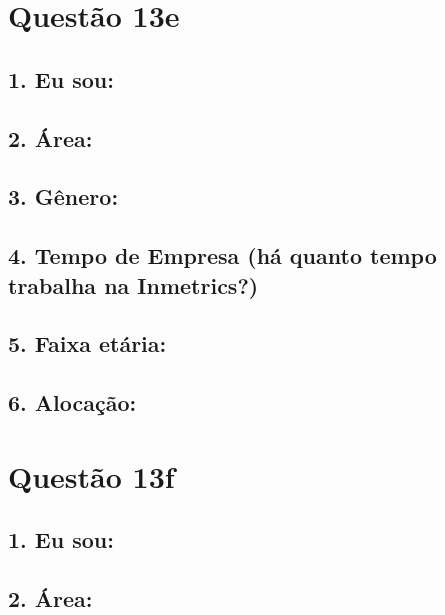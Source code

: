\documentclass[]{book}
\begin{document}
\hypertarget{questao-13e}{%
\section{Questão 13e}\label{questao-13e}}

\hypertarget{eu-sou-21}{%
\subsection{1. Eu sou:}\label{eu-sou-21}}

\hypertarget{area-21}{%
\subsection{2. Área:}\label{area-21}}

\hypertarget{genero-21}{%
\subsection{3. Gênero:}\label{genero-21}}

\hypertarget{tempo-de-empresa-ha-quanto-tempo-trabalha-na-inmetrics-21}{%
\subsection{4. Tempo de Empresa (há quanto tempo trabalha na Inmetrics?)}\label{tempo-de-empresa-ha-quanto-tempo-trabalha-na-inmetrics-21}}

\hypertarget{faixa-etaria-21}{%
\subsection{5. Faixa etária:}\label{faixa-etaria-21}}

\hypertarget{alocacao-21}{%
\subsection{6. Alocação:}\label{alocacao-21}}

\hypertarget{questao-13f}{%
\section{Questão 13f}\label{questao-13f}}

\hypertarget{eu-sou-22}{%
\subsection{1. Eu sou:}\label{eu-sou-22}}

\hypertarget{area-22}{%
\subsection{2. Área:}\label{area-22}}
\end{document}
